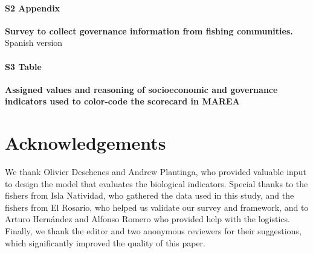 \documentclass[10pt,letterpaper]{article}
\begin{document}
\paragraph*{S2 Appendix}
\label{S2_Appendix}
{\bf Survey to collect governance information from fishing communities.} Spanish version

\paragraph*{S3 Table}
\label{S3_Table}
{\bf Assigned values and reasoning of socioeconomic and governance indicators used to color-code the scorecard in MAREA}

\section*{Acknowledgements}\label{acknowledgements}

We thank Olivier Deschenes and Andrew Plantinga, who provided valuable input to design the model that evaluates the biological indicators. Special thanks to the fishers from Isla Natividad, who gathered the data used in this study, and the fishers from El Rosario, who helped us validate our survey and framework, and to Arturo Hernández and Alfonso Romero who provided help with the logistics. Finally, we thank the editor and two anonymous reviewers for their suggestions, which significantly improved the quality of this paper.

\nolinenumbers


\end{document}
